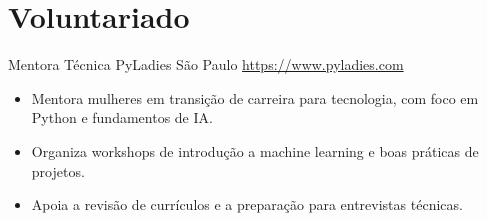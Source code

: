 \documentclass[a4paper, serif, 10pt]{moderncv}
\begin{document}
\section{Voluntariado}

        {Mentora Técnica}
        {PyLadies São Paulo}
        {\url{https://www.pyladies.com}}
        {}
        {\begin{itemize}
\item Mentora mulheres em transição de carreira para tecnologia, com foco em Python e fundamentos de IA.
\item Organiza workshops de introdução a machine learning e boas práticas de projetos.
\item Apoia a revisão de currículos e a preparação para entrevistas técnicas.
\end{itemize}}
    
\end{document}
